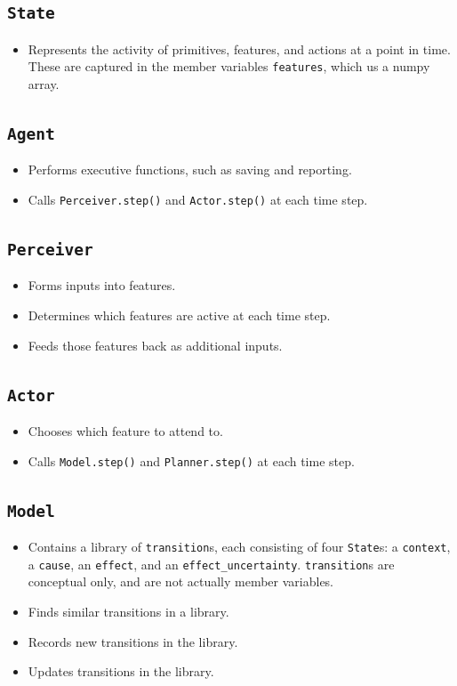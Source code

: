 \subsection{\texttt{State}}
\begin{itemize}
\item Represents the activity of primitives, features, and actions at a point in time. These are captured in the member variables \texttt{features}, which us a numpy array. 
\end{itemize}

\subsection{\texttt{Agent}}
\begin{itemize}
\item Performs executive functions, such as saving and reporting.
\item Calls \texttt{Perceiver.step()} and  \texttt{Actor.step()} at each time step.
\end{itemize}

\subsection{\texttt{Perceiver}}
\begin{itemize}
\item Forms inputs into features.
\item Determines which features are active at each time step.
\item Feeds those features back as additional inputs.
\end{itemize}

\subsection{\texttt{Actor}}
\begin{itemize}
\item Chooses which feature to attend to.
\item Calls \texttt{Model.step()} and  \texttt{Planner.step()} at each time step.
\end{itemize}

\subsection{\texttt{Model}}
\begin{itemize}
\item Contains a library of \texttt{transition}s, each consisting of four \texttt{State}s: a \texttt{context}, a \texttt{cause}, an \texttt{effect}, and an \texttt{effect\_uncertainty}. \texttt{transition}s are conceptual only, and are not actually member variables.
\item Finds similar transitions in a library.
\item Records new transitions in the library.
\item Updates transitions in the library.
\end{itemize}

